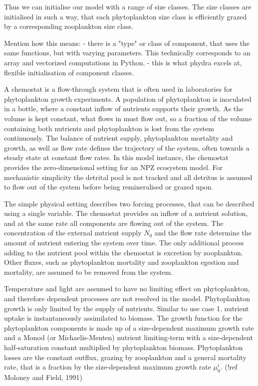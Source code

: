 \documentclass[template.tex]{subfiles}
\begin{document}
Thus we can initialise our model with a range of size classes. The size classes are initialised in such a way, that each phytoplankton size class is efficiently grazed by a corresponding zooplankton size class.

Mention how this means:
- there is a "type" or class of component, that uses the same functions, but with varying parameters. This technically corresponds to an array and vectorized computations in Python.
- this is what phydra excels at, flexible initialisation of component classes.

A chemostat is a flow-through system that is often used in laboratories for phytoplankton growth experiments. A population of phytoplankton is inoculated in a bottle, where a constant inflow of nutrients supports their growth. As the volume is kept constant, what flows in must flow out, so a fraction of the volume containing both nutrients and phytoplankton is lost from the system continuously. The balance of nutrient supply, phytoplankton mortality and growth, as well as flow rate defines the trajectory of the system, often towards a steady state at constant flow rates. 
In this model instance, the chemostat provides the zero-dimensional setting for an NPZ ecosystem model. For mechanistic simplicity the detrital pool is not tracked and all detritus is assumed to flow out of the system before being remineralised or grazed upon.

The simple physical setting describes two forcing processes, that can be described using a single variable. The chemostat provides an inflow of a nutrient solution, and at the same rate all components are flowing out of the system. The concentration of the external nutrient supply $N_0$ and the flow rate determine the amount of nutrient entering the system over time. The only additional process adding to the nutrient pool within the chemostat is excretion by zooplankton. Other fluxes, such as phytoplankton mortality and zooplankton egestion and mortality, are assumed to be removed from the system.

Temperature and light are assumed to have no limiting effect on phytoplankton, and therefore dependent processes are not resolved in the model. Phytoplankton growth is only limited by the supply of nutrients. Similar to use case 1, nutrient uptake is instantaneously assimilated to biomass. The growth function for the phytoplankton components is made up of a size-dependent maximum growth rate and a Monod (or Michaelis-Menten) nutrient limiting-term with a size-dependent half-saturation constant multiplied by phytoplankton biomass. 
Phytoplankton losses are the constant outflux, grazing by zooplankton and a general mortality rate, that is a fraction by the size-dependent maximum growth rate $\mu^i_0$. (!ref Moloney and Field, 1991)
\end{document}
